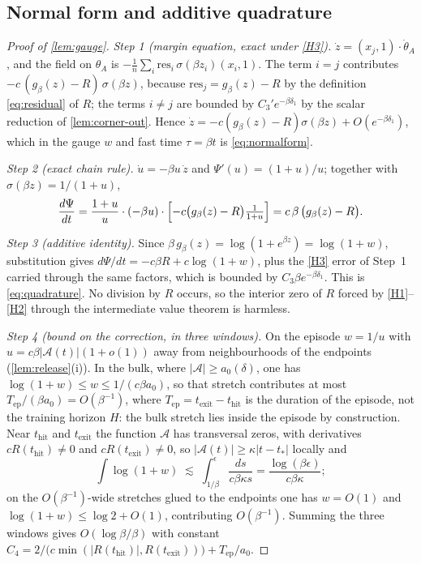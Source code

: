 \documentclass[11pt]{article}
\theoremstyle{definition}
\theoremstyle{remark}
\newcommand{\thit}{t_{\mathrm{hit}}}
\newcommand{\texit}{t_{\mathrm{exit}}}
\newcommand{\Ar}{\mathcal{A}}                      %
\newcommand{\Tep}{T_{\mathrm{ep}}}                 %
\begin{document}
\subsection{Normal form and additive quadrature}\label{app:L1}

\begin{proof}[Proof of \cref{lem:gauge}]
\emph{Step 1 (margin equation, exact under \eqref{H3}).}
$\dot z=(x_j,1)\cdot\dot\theta_A$, and the field on $\theta_A$ is
$-\tfrac1n\sum_i\mathrm{res}_i\,\sigma(\beta z_i)(x_i,1)$. The term $i=j$
contributes $-c\,(g_\beta(z)-R)\,\sigma(\beta z)$, because
$\mathrm{res}_j=g_\beta(z)-R$ by the definition \eqref{eq:residual} of $R$; the
terms $i\ne j$ are bounded by $C_3'e^{-\beta\delta_1}$ by the scalar reduction of
\cref{lem:corner-out}. Hence
$\dot z=-c(g_\beta(z)-R)\sigma(\beta z)+O(e^{-\beta\delta_1})$, which in the
gauge $w$ and fast time $\tau=\beta t$ is \eqref{eq:normalform}.

\emph{Step 2 (exact chain rule).} $\dot u=-\beta u\,\dot z$ and
$\Psi'(u)=(1+u)/u$; together with $\sigma(\beta z)=1/(1+u)$,
\[
\frac{d\Psi}{dt}
=\frac{1+u}{u}\cdot(-\beta u)\cdot
\Bigl[-c\bigl(g_\beta(z)-R\bigr)\tfrac{1}{1+u}\Bigr]
=c\,\beta\,\bigl(g_\beta(z)-R\bigr).
\]

\emph{Step 3 (additive identity).} Since $\beta\,g_\beta(z)=\log(1+e^{\beta z})
=\log(1+w)$, substitution gives $d\Psi/dt=-c\beta R+c\log(1+w)$, plus the
\eqref{H3} error of Step~1 carried through the same factors, which is bounded by
$C_3\beta e^{-\beta\delta_1}$. This is \eqref{eq:quadrature}. No division by $R$
occurs, so the interior zero of $R$ forced by \eqref{H1}--\eqref{H2} through the
intermediate value theorem is harmless.

\emph{Step 4 (bound on the correction, in three windows).} On the episode
$w=1/u$ with $u=c\beta|\Ar(t)|(1+o(1))$ away from neighbourhoods of the endpoints
(\cref{lem:release}(i)). In the bulk, where $|\Ar|\ge a_0(\delta)$, one has
$\log(1+w)\le w\le 1/(c\beta a_0)$, so that stretch contributes at most
$\Tep/(\beta a_0)=O(\beta^{-1})$, where $\Tep=\texit-\thit$ is the duration of the
episode, not the training horizon $H$: the bulk stretch lies inside the episode by
construction. Near $\thit$ and $\texit$ the function $\Ar$ has
transversal zeros, with derivatives $cR(\thit)\ne0$ and $cR(\texit)\ne0$, so
$|\Ar(t)|\ge\kappa|t-t_\ast|$ locally and
\[
\int\log(1+w)\;\lesssim\;\int_{1/\beta}^{\epsilon}\frac{ds}{c\beta\kappa s}
=\frac{\log(\beta\epsilon)}{c\beta\kappa};
\]
on the $O(\beta^{-1})$-wide stretches glued to the endpoints one has $w=O(1)$ and
$\log(1+w)\le\log2+O(1)$, contributing $O(\beta^{-1})$. Summing the three windows
gives $O(\log\beta/\beta)$ with constant
$C_4=2/\bigl(c\min(|R(\thit)|,R(\texit))\bigr)+\Tep/a_0$.
\end{proof}
\end{document}
